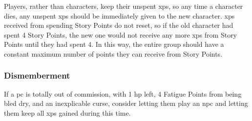 \begin{multicols}{2}
Players, rather than characters, keep their unspent \glspl{xp}, so any time a character dies, any unspent \glspl{xp} should be immediately given to the new character.
\Glspl{xp} received from spending Story Points do not reset, so if the old character had spent 4 Story Points, the new one would not receive any more \glspl{xp} from Story Points until they had spent 4.
In this way, the entire group should have a constant maximum number of points they can receive from Story Points.

\subsubsection{Dismemberment}

If a \gls{pc} is totally out of commission, with 1 \gls{hp} left, 4 Fatigue Points from being bled dry, and an inexplicable curse, consider letting them play an \gls{npc} and letting them keep all \glspl{xp} gained during this time.

\end{multicols}
